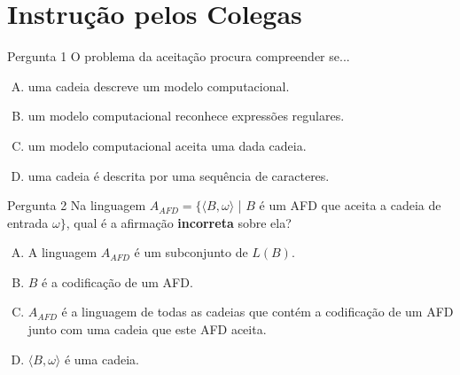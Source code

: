 \documentclass[xcolor=dvipsnames,table]{beamer}
\begin{document}
	\section{Instrução pelos Colegas}
	\begin{frame}
		\begin{block}{Pergunta 1}
			O problema da aceitação procura compreender se...
		\end{block}
		\begin{enumerate}[(A)]
			\item uma cadeia descreve um modelo computacional.
			\item um modelo computacional reconhece expressões regulares.
			\item um modelo computacional aceita uma dada cadeia.
			\item uma cadeia é descrita por uma sequência de caracteres.
		\end{enumerate}
	\end{frame}

	\begin{frame}
		\begin{block}{Pergunta 2}
			Na linguagem $A_{AFD} = \{\langle B, \omega \rangle$ | $B$ é um AFD que aceita a cadeia de entrada $\omega \}$, qual é a afirmação {\bf incorreta} sobre ela?
		\end{block}
		\begin{enumerate}[(A)]
			\item A linguagem $A_{AFD}$ é um subconjunto de $L(B)$.
			\item $B$ é a codificação de um AFD.
			\item $A_{AFD}$ é a linguagem de todas as cadeias que contém a codificação de um AFD junto com uma cadeia que este AFD aceita.
			\item $\langle B, \omega \rangle$ é uma cadeia.
			
		\end{enumerate}
	\end{frame}
\end{document}
